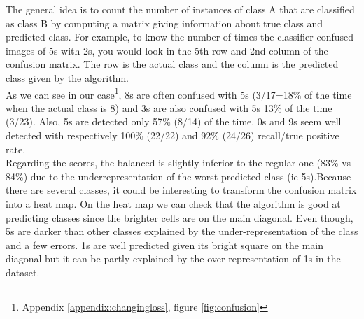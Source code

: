 The general idea is to count the number of instances of class A that are classified as class B by computing a matrix giving information about true class and predicted class. For example, to know the number of times the classifier confused images of 5s with 2s, you would look in the 5th row and 2nd column of the confusion matrix. The row is the actual class and the column is the predicted class given by the algorithm. \\

As we can see in our case\footnote{Appendix \ref{appendix:changingloss}, figure \ref{fig:confusion}}, 8s are often confused with 5s (3/17=18\% of the time when the actual class is 8) and 3s are also confused with 5s 13\% of the time (3/23). Also, 5s are detected only 57\% (8/14) of the time. 0s and 9s seem well detected with respectively 100\% (22/22) and 92\% (24/26) recall/true positive rate.\\

Regarding the scores, the balanced is slightly inferior to the regular one (83\% vs 84\%) due to the underrepresentation of the worst predicted class (ie 5s).Because there are several classes, it could be interesting to transform the confusion matrix into a heat map. On the heat map we can check that the algorithm is good at predicting classes since the brighter cells are on the main diagonal. Even though, 5s are darker than other classes explained by the under-representation of the class and a few errors. 1s are well predicted given its bright square on the main diagonal but it can be partly explained by the over-representation of 1s in the dataset. 


